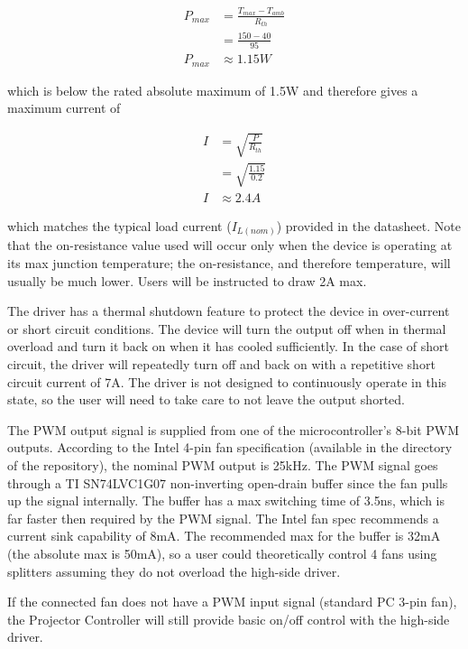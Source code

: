 \documentclass{article}
\begin{document}
\begin{align*}
    P_{max} &= \frac{T_{max}-T_{amb}}{R_{th}} \\
    &= \frac{150 - 40}{95} \\
    P_{max} &\approx 1.15W
\end{align*}

which is below the rated absolute maximum of 1.5W and therefore gives a maximum current of

\begin{align*}
    I &= \sqrt{\frac{P}{R_{th}}} \\
    &= \sqrt{\frac{1.15}{0.2}} \\
    I &\approx 2.4A
\end{align*}

which matches the typical load current ($I_{L(nom)}$) provided in the datasheet.  Note that the
on-resistance value used will occur only when the device is operating at its max junction
temperature; the on-resistance, and therefore temperature, will usually be much lower.  Users will
be instructed to draw 2A max.

The driver has a thermal shutdown feature to protect the device in over-current or short circuit
conditions.  The device will turn the output off when in thermal overload and turn it back on when
it has cooled sufficiently.  In the case of short circuit, the driver will repeatedly turn off and
back on with a repetitive short circuit current of 7A.  The driver is not designed to continuously
operate in this state, so the user will need to take care to not leave the output shorted.

The PWM output signal is supplied from one of the microcontroller's 8-bit PWM outputs.  According to
the Intel 4-pin fan specification (available in the  directory of the
repository), the nominal PWM output is 25kHz.  The PWM signal goes through a TI SN74LVC1G07
non-inverting open-drain buffer since the fan pulls up the signal internally. The buffer has a max
switching time of 3.5ns, which is far faster then required by the PWM signal.  The Intel fan spec
recommends a current sink capability of 8mA.  The recommended max for the buffer is 32mA (the
absolute max is 50mA), so a user could theoretically control 4 fans using splitters assuming they do
not overload the high-side driver.

If the connected fan does not have a PWM input signal (standard PC 3-pin fan), the Projector
Controller will still provide basic on/off control with the high-side driver.
\end{document}
